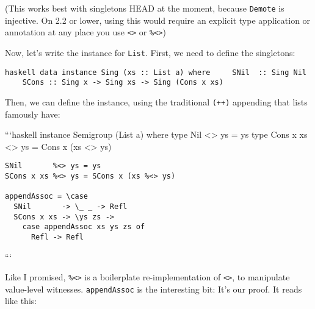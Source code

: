 \documentclass[]{article}
\begin{document}
(This works best with singletons HEAD at the moment, because \texttt{Demote} is
injective. On 2.2 or lower, using this would require an explicit type
application or annotation at any place you use
\texttt{\textless{}\textgreater{}} or \texttt{\%\textless{}\textgreater{}})

Now, let's write the instance for \texttt{List}. First, we need to define the
singletons:

\texttt{haskell\ data\ instance\ Sing\ (xs\ ::\ List\ a)\ where\ \ \ \ \ SNil\ \ ::\ Sing\ Nil\ \ \ \ \ SCons\ ::\ Sing\ x\ -\textgreater{}\ Sing\ xs\ -\textgreater{}\ Sing\ (Cons\ x\ xs)}

Then, we can define the instance, using the traditional \texttt{(++)} appending
that lists famously have:

```haskell instance Semigroup (List a) where type Nil \textless{}\textgreater{}
ys = ys type Cons x xs \textless{}\textgreater{} ys = Cons x (xs
\textless{}\textgreater{} ys)

\begin{verbatim}
SNil       %<> ys = ys
SCons x xs %<> ys = SCons x (xs %<> ys)

appendAssoc = \case
  SNil       -> \_ _ -> Refl
  SCons x xs -> \ys zs ->
    case appendAssoc xs ys zs of
      Refl -> Refl
\end{verbatim}

```

Like I promised, \texttt{\%\textless{}\textgreater{}} is a boilerplate
re-implementation of \texttt{\textless{}\textgreater{}}, to manipulate
value-level witnesses. \texttt{appendAssoc} is the interesting bit: It's our
proof. It reads like this:
\end{document}
